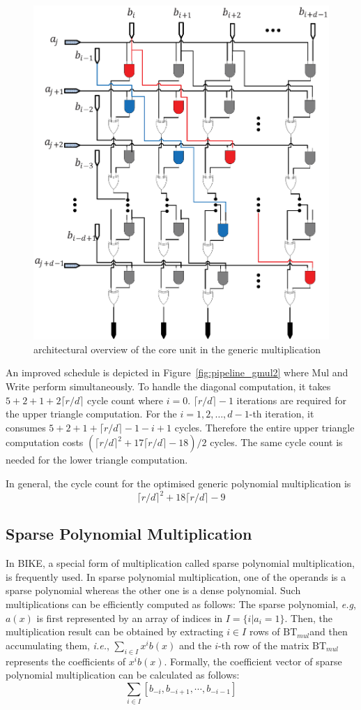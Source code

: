 \documentclass[runningheads]{llncs}
\begin{document}
\begin{figure}[!tb]
\centering
\includegraphics[width=.55\textwidth]{./fig/dsnmul_core.eps}
\caption{architectural overview of the core unit in the generic multiplication}\label{fig:gmul_core}
\end{figure}

An improved schedule is depicted in Figure~\ref{fig:pipeline_gmul2}
where Mul and Write perform simultaneously.
To handle the diagonal computation,
it takes $5+2+1+2\lceil r/d\rceil$ cycle count where $i=0$. $\lceil r/d\rceil -1$ iterations are required for the upper triangle computation.
For the $i=1,2,\ldots,d-1$-th iteration, it
consumes $5+2+1+\lceil r/d\rceil -1-i+1$ cycles.
Therefore the entire upper triangle computation costs $(\lceil r/d\rceil^2 +17\lceil r/d\rceil-18)/2$ cycles.
The same cycle count is needed for the lower triangle computation.

In general, the cycle count for the optimised generic polynomial multiplication is
\[
    \lceil r/d\rceil^2 + 18\lceil r/d\rceil - 9
\]



\subsection{Sparse Polynomial Multiplication}
\label{sub::sparse}
In BIKE, a special form of multiplication called sparse polynomial multiplication,
is frequently used. In sparse polynomial multiplication, one of the operands
is a sparse polynomial whereas the other one is a dense polynomial.
Such multiplications can be efficiently computed as follows:
The sparse polynomial, \textit{e.g}, $a(x)$ is first represented
by an array of indices in $I=\{i|a_i=1\}$.
Then, the multiplication result can be obtained by extracting $i\in I$ rows of $\text{BT}_{mul}$and then accumulating them, \textit{i.e.}, $\sum_{i\in I} x^ib(x)$ and the $i$-th row of the matrix $\text{BT}_{mul}$ represents the coefficients of $x^ib(x)$. Formally, the coefficient vector of sparse polynomial multiplication can be calculated as follows:
\[
    \sum_{i\in I} [b_{-i},b_{-i+1},\cdots,b_{-i-1}]
\]
\end{document}
